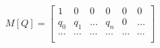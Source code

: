 \documentclass[preview]{standalone}
\begin{document}
\begin{align*}
M[Q] = \begin{bmatrix}1 & 0 & 0 & 0 & 0 & 0 \\q_0 & q_1 & \ldots & q_n & 0 & \ldots \\\cdots & \cdots & \cdots & \cdots & \cdots & \cdots \\\end{bmatrix}
\end{align*}
\end{document}

